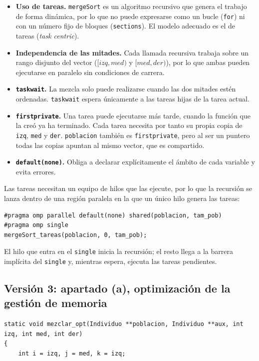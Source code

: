 \documentclass[12pt]{article}
\begin{document}
\begin{enumerate}
\begin{itemize}
    \item \textbf{Uso de tareas.} \texttt{mergeSort} es un algoritmo recursivo que genera el trabajo de forma dinámica, por lo que no puede expresarse como un bucle (\texttt{for}) ni con un número fijo de bloques (\texttt{sections}). El modelo adecuado es el de tareas (\textit{task centric}).
    \item \textbf{Independencia de las mitades.} Cada llamada recursiva trabaja sobre un rango disjunto del vector ($[izq, med)$ y $[med, der)$), por lo que ambas pueden ejecutarse en paralelo sin condiciones de carrera.
    \item \textbf{\texttt{taskwait}.} La mezcla solo puede realizarse cuando las dos mitades estén ordenadas. \texttt{taskwait} espera únicamente a las tareas hijas de la tarea actual.
    \item \textbf{\texttt{firstprivate}.} Una tarea puede ejecutarse más tarde, cuando la función que la creó ya ha terminado. Cada tarea necesita por tanto su propia copia de \texttt{izq}, \texttt{med} y \texttt{der}. \texttt{poblacion} también es \texttt{firstprivate}, pero al ser un puntero todas las copias apuntan al mismo vector, que es compartido.
    \item \textbf{\texttt{default(none)}.} Obliga a declarar explícitamente el ámbito de cada variable y evita errores.
\end{itemize}
 
Las tareas necesitan un equipo de hilos que las ejecute, por lo que la recursión se lanza dentro de una región paralela en la que un único hilo genera las tareas:
 
\begin{lstlisting}[style=EstiloC]
#pragma omp parallel default(none) shared(poblacion, tam_pob)
#pragma omp single
mergeSort_tareas(poblacion, 0, tam_pob);
\end{lstlisting}
 
El hilo que entra en el \texttt{single} inicia la recursión; el resto llega a la barrera implícita del \texttt{single} y, mientras espera, ejecuta las tareas pendientes.
 
\subsection*{Versión 3: apartado (a), optimización de la gestión de memoria}
 
\begin{lstlisting}[style=EstiloC]
static void mezclar_opt(Individuo **poblacion, Individuo **aux, int izq, int med, int der)
{
    int i = izq, j = med, k = izq;
 

\end{lstlisting}
\end{enumerate}
\end{document}
